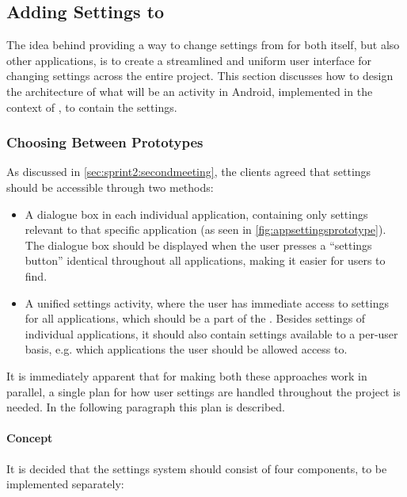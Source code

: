 \subsection{Adding Settings to \giraf}\label{sec:sprint3:designsettings}
The idea behind providing a way to change settings from \launcher for both itself, but also other \giraf applications, is to create a streamlined and uniform user interface for changing settings across the entire project.
This section discusses how to design the architecture of what will be an activity in Android, implemented in the context of \launcher, to contain the settings.

\subsubsection{Choosing Between Prototypes}
As discussed in \cref{sec:sprint2:secondmeeting}, the clients agreed that settings should be accessible through two methods:

\begin{itemize}
	\item A dialogue box in each individual application, containing only settings relevant to that specific application (as seen in \cref{fig:appsettingsprototype}). 
	The dialogue box should be displayed when the user presses a ``settings button'' identical throughout all \giraf applications, making it easier for users to find.
	\item A unified settings activity, where the user has immediate access to settings for all \giraf applications, which should be a part of the \launcher. 
	Besides settings of individual applications, it should also contain settings available to a per-user basis, e.g. which applications the user should be allowed access to.
\end{itemize}

It is immediately apparent that for making both these approaches work in parallel, a single plan for how user settings are handled throughout the \giraf project is needed. 
In the following paragraph this plan is described.

\paragraph{Concept}
It is decided that the settings system should consist of four components, to be implemented separately:

